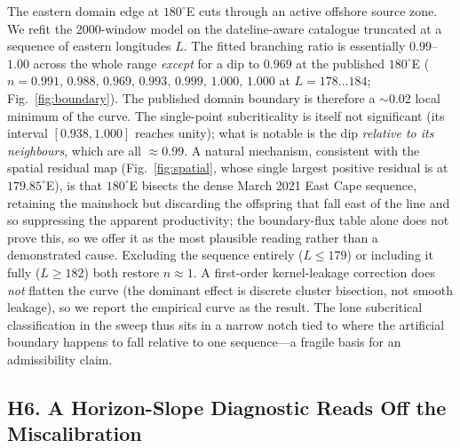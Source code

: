 The eastern domain edge at $180^\circ$E cuts through an active offshore source
zone. We refit the 2000-window model on the dateline-aware catalogue truncated at a
sequence of eastern longitudes $L$. The fitted branching ratio is essentially
$0.99$--$1.00$ across the whole range \emph{except} for a dip to $0.969$ at the
published $180^\circ$E ($n=0.991,\,0.988,\,\mathbf{0.969},\,0.993,\,0.999,\,1.000,
\,1.000$ at $L=178\ldots184$; Fig.~\ref{fig:boundary}). The published domain
boundary is therefore a $\sim$0.02 local minimum of the curve. The single-point
subcriticality is itself not significant (its interval $[0.938,1.000]$ reaches
unity); what is notable is the dip \emph{relative to its neighbours}, which are all
$\approx0.99$. A natural mechanism, consistent with the spatial residual map
(Fig.~\ref{fig:spatial}, whose single largest positive residual is at
$179.85^\circ$E), is that $180^\circ$E bisects the dense March 2021 East Cape
sequence, retaining the mainshock but discarding the offspring that fall east of
the line and so suppressing the apparent productivity; the boundary-flux table
alone does not prove this, so we offer it as the most plausible reading rather than
a demonstrated cause. Excluding the sequence entirely ($L\le179$) or including it
fully ($L\ge182$) both restore $n\approx1$. A first-order kernel-leakage correction
does \emph{not} flatten the curve (the dominant effect is discrete cluster
bisection, not smooth leakage), so we report the empirical curve as the result. The
lone subcritical classification in the sweep thus sits in a narrow notch tied to
where the artificial boundary happens to fall relative to one sequence---a fragile
basis for an admissibility claim.

\subsection*{H6. A Horizon-Slope Diagnostic Reads Off the Miscalibration}

